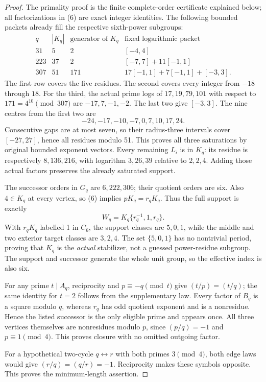 \begin{proof}
The primality proof is the finite complete-order certificate explained below;
all factorizations in (6) are exact integer identities. The following bounded
packets already fill the respective sixth-power subgroups:
\[
\begin{array}{c|c|c|c}
q&|K_q|&\text{generator of }K_q&\text{fixed logarithmic packet}\\\hline
31&5&2&[-4,4]\\
223&37&2&[-7,7]+11[-1,1]\\
307&51&171&17[-1,1]+7[-1,1]+[-3,3].
\end{array}                                                   \tag{8}
\]
The first row covers the five residues. The second covers every integer from
$-18$ through $18$. For the third, the actual prime logs of $17,19,79,101$
with respect to $171=4^{10}\pmod{307}$ are $-17,7,-1,-2$. The last two give
$[-3,3]$. The nine centres from the first two are
\[
 -24,-17,-10,-7,0,7,10,17,24.
\]
Consecutive gaps are at most seven, so their radius-three intervals cover
$[-27,27]$, hence all residues modulo 51. This proves all three saturations
by original bounded exponent vectors. Every remaining $L_i$ is in $K_q$:
its residue is respectively $8,136,216$, with logarithm $3,26,39$ relative to
$2,2,4$. Adding those actual factors preserves the already saturated support.

The successor orders in $G_q$ are $6,222,306$; their quotient orders are six.
Also $4\in K_q$ at every vertex, so (6) implies
$pK_q=r_qK_q$. Thus the full support is exactly
\[
 W_q=K_q\{r_q^{-1},1,r_q\}.                              \tag{9}
\]
With $r_qK_q$ labelled 1 in $C_6$, the support classes are $5,0,1$, while the
middle and two exterior target classes are $3,2,4$. The set $\{5,0,1\}$ has
no nontrivial period, proving that $K_q$ is the \emph{actual} stabilizer, not a
guessed power-residue subgroup. The support and successor generate the whole
unit group, so the effective index is also six.

For any prime $t\mid A_q$, reciprocity and $p\equiv-q\pmod t$ give
$(t/p)=(t/q)$; the same identity for $t=2$ follows from the supplementary law.
Every factor of $B_q$ is a square modulo $q$, whereas $r_q$ has odd quotient
exponent and is a nonresidue. Hence the listed successor is the only eligible
prime and appears once. All three vertices themselves are nonresidues modulo
$p$, since $(p/q)=-1$ and $p\equiv1\pmod4$. This proves closure with no omitted
outgoing factor.

For a hypothetical two-cycle $q\leftrightarrow r$ with both primes
$3\pmod4$, both edge laws would give $(r/q)=(q/r)=-1$. Reciprocity makes these
symbols opposite. This proves the minimum-length assertion.
\end{proof}


